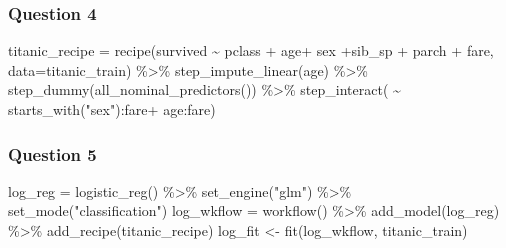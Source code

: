 \documentclass[
]{article}
\newenvironment{Shaded}{\begin{snugshade}}{\end{snugshade}}
\newcommand{\AttributeTok}[1]{\textcolor[rgb]{0.77,0.63,0.00}{#1}}
\newcommand{\FunctionTok}[1]{\textcolor[rgb]{0.00,0.00,0.00}{#1}}
\newcommand{\NormalTok}[1]{#1}
\newcommand{\OtherTok}[1]{\textcolor[rgb]{0.56,0.35,0.01}{#1}}
\newcommand{\SpecialCharTok}[1]{\textcolor[rgb]{0.00,0.00,0.00}{#1}}
\newcommand{\StringTok}[1]{\textcolor[rgb]{0.31,0.60,0.02}{#1}}
\begin{document}
\hypertarget{question-4}{%
\subsubsection{Question 4}\label{question-4}}

\begin{Shaded}
\begin{Highlighting}[]
\NormalTok{titanic\_recipe }\OtherTok{=} \FunctionTok{recipe}\NormalTok{(survived }\SpecialCharTok{\textasciitilde{}}\NormalTok{ pclass }\SpecialCharTok{+}\NormalTok{ age}\SpecialCharTok{+}\NormalTok{ sex }\SpecialCharTok{+}\NormalTok{sib\_sp }\SpecialCharTok{+}\NormalTok{ parch }\SpecialCharTok{+}\NormalTok{ fare, }\AttributeTok{data=}\NormalTok{titanic\_train) }\SpecialCharTok{\%\textgreater{}\%}
 \FunctionTok{step\_impute\_linear}\NormalTok{(age) }\SpecialCharTok{\%\textgreater{}\%}
 \FunctionTok{step\_dummy}\NormalTok{(}\FunctionTok{all\_nominal\_predictors}\NormalTok{()) }\SpecialCharTok{\%\textgreater{}\%}
 \FunctionTok{step\_interact}\NormalTok{( }\SpecialCharTok{\textasciitilde{}} \FunctionTok{starts\_with}\NormalTok{(}\StringTok{"sex"}\NormalTok{)}\SpecialCharTok{:}\NormalTok{fare}\SpecialCharTok{+}\NormalTok{ age}\SpecialCharTok{:}\NormalTok{fare)}
\end{Highlighting}
\end{Shaded}

\hypertarget{question-5}{%
\subsubsection{Question 5}\label{question-5}}

\begin{Shaded}
\begin{Highlighting}[]
\NormalTok{log\_reg }\OtherTok{=} \FunctionTok{logistic\_reg}\NormalTok{() }\SpecialCharTok{\%\textgreater{}\%}
  \FunctionTok{set\_engine}\NormalTok{(}\StringTok{"glm"}\NormalTok{) }\SpecialCharTok{\%\textgreater{}\%}
  \FunctionTok{set\_mode}\NormalTok{(}\StringTok{"classification"}\NormalTok{)}
\NormalTok{log\_wkflow }\OtherTok{=} \FunctionTok{workflow}\NormalTok{() }\SpecialCharTok{\%\textgreater{}\%}
  \FunctionTok{add\_model}\NormalTok{(log\_reg) }\SpecialCharTok{\%\textgreater{}\%}
  \FunctionTok{add\_recipe}\NormalTok{(titanic\_recipe)}
\NormalTok{log\_fit }\OtherTok{\textless{}{-}} \FunctionTok{fit}\NormalTok{(log\_wkflow, titanic\_train)}
\end{Highlighting}
\end{Shaded}
\end{document}
